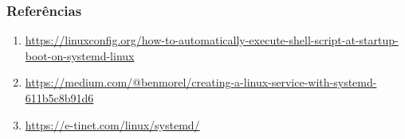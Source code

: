 \documentclass{beamer}
\begin{document}
    \begin{frame}
	\frametitle{Referências}
	\begin{enumerate}
	   \item \url{https://linuxconfig.org/how-to-automatically-execute-shell-script-at-startup-boot-on-systemd-linux}
           \item \url{https://medium.com/@benmorel/creating-a-linux-service-with-systemd-611b5c8b91d6}
           \item \url{https://e-tinet.com/linux/systemd/}
	\end{enumerate}
    \end{frame}
\end{document}
